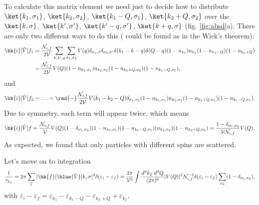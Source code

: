 To calculate this matrix element we need just to decide how to distribute $\ket{k_1, \sigma_1}$, $\ket{k_2, \sigma_2}$, $\ket{k_1-Q, \sigma_1}$, $\ket{k_2+Q, \sigma_2}$ over the $\ket{k, \sigma}$, $\ket{k', \sigma'}$, $\ket{k'-q, \sigma'}$, $\ket{k+q,\sigma}$ (fig. \ref{fig:absd}a). There are only two different ways to do this ( could be found as in the Wick's theorem):
\begin{align*}
	\bk{i}[\hat{V}]{f}_1 
	&= 
	\frac{\mathcal{N}_{i,f}}{2\mathcal{V}} \sum_{k,k',q} \sum_{\sigma_1,\sigma_2} V(q)   \delta_{\sigma_1, \sigma} \delta_{\sigma_2, \sigma'} \delta(k_1-k-q)  \delta(Q-q) (1-n_{k_1}) n_{k_2} (1-n_{k_1-Q}) (1-n_{k_2+Q})
	\\ &= 
	\frac{\mathcal{N}_{i,f}}{2\mathcal{V}} V(Q) (1-n_{k_1, \sigma_1}) n_{k_2,\sigma_2} (1-n_{k_2+Q,\sigma_2})(1-n_{k_1-Q,\sigma_1})
	,
\end{align*}
and
\begin{align*}
	\bk{i}[\hat{V}]{f}_2 = \ldots
	= \red{-} \frac{\mathcal{N}_{i,f}}{2\mathcal{V}} V(k_1-k_2-Q) \delta_{\sigma_1, \sigma_2} 
	(1-n_{k_1,\sigma_1} )
	n_{k_2,\sigma_2}
	(1-n_{k_2+Q,\sigma_2})
	(1-n_{k_1-Q,\sigma_1})
	.
\end{align*}
Due to symmetry, each term will appear twice, which means
\begin{equation*}
	\bk{i}[\hat{V}]{f} = \frac{\mathcal{N}_{i,f}}{\mathcal{V}} V(Q) (1-\delta_{\sigma_1,\sigma_2}) (1- n_{k_1, \sigma_1})(1- n_{k_1-Q, \sigma_1}) (n_{k_2, \sigma_2})(1- n_{k_2+Q, \sigma_2}) = \frac{1-\delta_{\sigma_1,\sigma_2}}{\mathcal{V} \mathcal{N}_{i,f}} V(Q).
\end{equation*}
As expected, we found that only particles with different spins are scattered.


Let's move on to integration
\begin{equation*}
	\frac{1}{\tau_{k_1}} 
	= 
	2 \pi \sum_{f} |\bk{f}[\blue{\hat{V}}]{k, \sigma}|^2 \delta(\varepsilon_i - \varepsilon_f) 
	= 
	\frac{2\pi}{\mathcal{V}^2} \int \frac{d^3 k_2\ d^3 Q}{(2\pi)^6} |V(Q)|^2 \mathcal{N}_{i,f}^{-2}
	\delta(\varepsilon_i - \varepsilon_f) \sum_{\sigma_2} (1-\delta_{\sigma_1,\sigma_2}),
\end{equation*}
with $\varepsilon_i - \varepsilon_f = \varepsilon_{k_1} - \varepsilon_{k_1-Q} - \varepsilon_{k_2+Q} + \varepsilon_{k_2}$.


